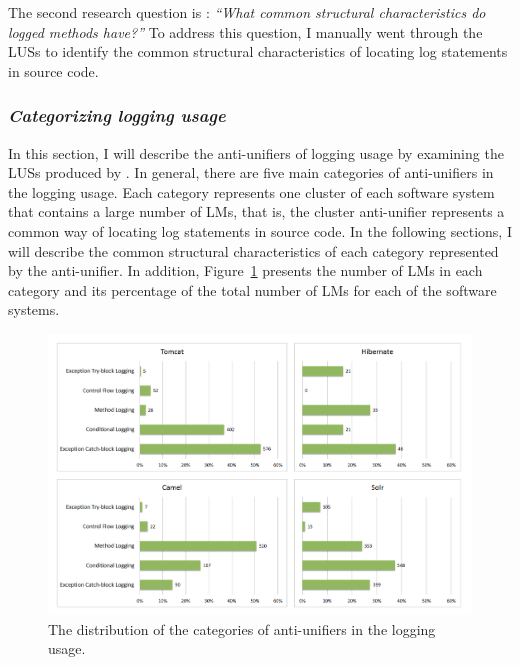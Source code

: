 The second research question is : \emph{``What common structural characteristics do logged methods have?''}
To address this question, I manually went through the LUSs to identify the common structural characteristics of locating log statements in source code.


\subsubsection{\emph{Categorizing logging usage}} \label{categories}
In this section, I will describe the anti-unifiers of logging usage by examining the LUSs produced by . In general, there are five main categories of anti-unifiers in the logging usage. Each category represents one cluster of each software system that contains a large number of LMs, that is, the cluster anti-unifier represents a common way of locating log statements in source code. In the following sections, I will describe the common structural characteristics of each category represented by the anti-unifier. In addition, Figure~\ref{fig:categories} presents the number of LMs in each category and its percentage of the total number of LMs for each of the software systems.
\begin{figure} [p]
   \centering\includegraphics [width = 1\textwidth, height = 0.7\textheight]{Charts/Categories.png}
  \caption{The distribution of the categories of anti-unifiers in the logging usage.}
  \label{fig:categories}
\end{figure}


